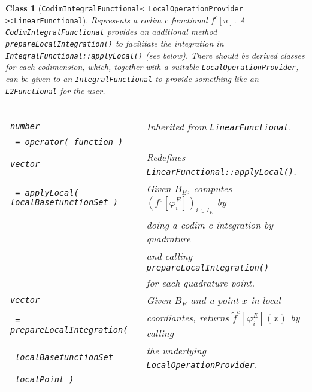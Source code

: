 \documentclass[a4paper,11pt]{article}
\numberwithin{equation}{section}
\newtheorem{class}[definition]{Class}
\newcommand{\theoremEndLine}{\hspace{1mm}}
\newcommand{\Code}[1]{\texttt{#1}}
\newcommand{\CodeT}[1]{\textnormal{\texttt{#1}}}
\begin{document}
    \begin{class}[\Code{CodimIntegralFunctional< LocalOperationProvider >:LinearFunctional}]
      Represents a codim c functional ${f^c[u]}$. A \CodeT{CodimIntegralFunctional} provides an additional method
      \CodeT{prepareLocalIntegration()} to facilitate the integration in\\
      \CodeT{IntegralFunctional::applyLocal()} (see below). There should be derived classes for each codimension, which,
      together with a suitable \CodeT{LocalOperationProvider}, can be given to an \CodeT{IntegralFunctional} to provide
      something like an \CodeT{L2Functional} for the user.\\\\
      \begin{tabular}{|l|l|}
        \hline
        \CodeT{number}
          & Inherited from \CodeT{LinearFunctional}.\\
        \CodeT{ = operator( function )}
          & \\
        \hline
        \CodeT{vector}
          & Redefines \CodeT{LinearFunctional::applyLocal()}.\\
        \CodeT{ = applyLocal( localBasefunctionSet )}
          & Given ${B_E}$, computes ${(f^c[\varphi_i^E])_{i\in I_E}}$ by\\
          & doing a codim c integration by quadrature\\
          & and calling \CodeT{prepareLocalIntegration()}\\
          & for each quadrature point.\\
        \hline
        \CodeT{vector}
          & Given ${B_E}$ and a point $x$ in local\\
        \CodeT{ = prepareLocalIntegration(}
          & coordiantes, returns ${\tilde{f}^c[\varphi_i^E]}(x)$ by calling\\
        \CodeT{ localBasefunctionSet}
          & the underlying \CodeT{LocalOperationProvider}.\\
        \CodeT{ localPoint )}
          &\\
        \hline
      \end{tabular}
    \end{class}\theoremEndLine
\end{document}
